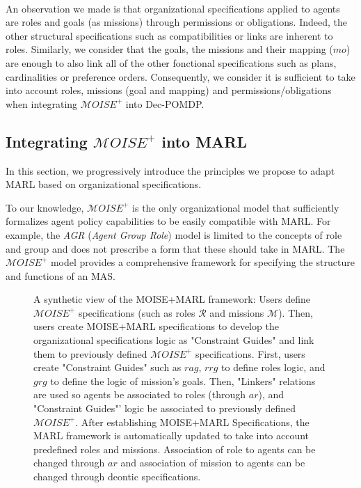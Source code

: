 \documentclass[sigconf,anonymous]{aamas}
\begin{document}
\

An observation we made is that organizational specifications applied to agents are roles and goals (as missions) through permissions or obligations. Indeed, the other structural specifications such as compatibilities or links are inherent to roles. Similarly, we consider that the goals, the missions and their mapping ($mo$) are enough to also link all of the other fonctional specifications such as plans, cardinalities or preference orders.
Consequently, we consider it is sufficient to take into account roles, missions (goal and mapping) and permissions/obligations when integrating $\mathcal{M}OISE^+$ into Dec-POMDP. 

\subsection{Integrating $\mathcal{M}OISE^+$ into MARL}

In this section, we progressively introduce the principles we propose to adapt MARL based on organizational specifications.

To our knowledge, $\mathcal{M}OISE^+$ is the only organizational model that sufficiently formalizes agent policy capabilities to be easily compatible with MARL. For example, the \textit{AGR} (\textit{Agent Group Role}) model is limited to the concepts of role and group and does not prescribe a form that these should take in MARL. The $\mathcal{M}OISE^+$ model provides a comprehensive framework for specifying the structure and functions of an MAS.

\begin{figure*}[h!]
    \centering
    
    \caption{A synthetic view of the MOISE+MARL framework: Users define $\mathcal{M}OISE^+$ specifications (such as roles $\mathcal{R}$ and missions $\mathcal{M}$). Then, users create MOISE+MARL specifications to develop the organizational specifications logic as "Constraint Guides" and link them to previously defined $\mathcal{M}OISE^+$ specifications. First, users create "Constraint Guides" such as $rag$, $rrg$ to define roles logic, and $grg$ to define the logic of mission's goals. Then, "Linkers" relations are used so agents be associated to roles (through $ar$), and "Constraint Guides"' logic be associated to previously defined $\mathcal{M}OISE^+$. After establishing MOISE+MARL Specifications, the MARL framework is automatically updated to take into account predefined roles and missions. Association of role to agents can be changed through $ar$ and association of mission to agents can be changed through deontic specifications.}
    \label{fig:mm_synthesis}
  \end{figure*}
  
\end{document}
